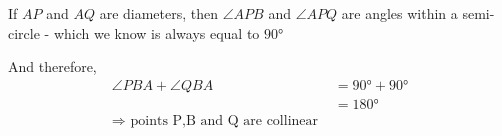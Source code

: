 \begin{solution}
	If $AP$ and $AQ$ are diameters, then $\angle APB$ and $\angle APQ$ are angles
	within a semi-circle - which we know is always equal to $\ang{90}$
	
	And therefore, 
	\begin{align}
		\angle PBA + \angle QBA &= \ang{90} + \ang{90} \\
		                        &= \ang{180} \\
		     \Rightarrow \text{ points P,B and Q are collinear }
	\end{align}
\end{solution}

